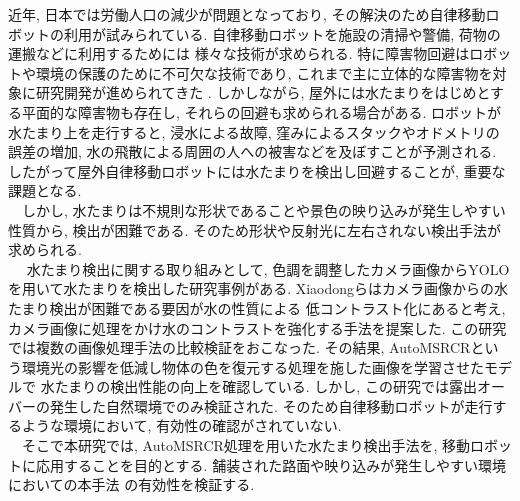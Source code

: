 \documentclass[10pt]{jarticle}
\begin{document}
    近年, 日本では労働人口の減少が問題となっており, 
    その解決のため自律移動ロボットの利用が試みられている. 
    自律移動ロボットを施設の清掃や警備, 荷物の運搬などに利用するためには
    様々な技術が求められる. 
    特に障害物回避はロボットや環境の保護のために不可欠な技術であり, 
    これまで主に立体的な障害物を対象に研究開発が進められてきた\cite{朝田2019} . 
    しかしながら, 屋外には水たまりをはじめとする平面的な障害物も存在し, 
    それらの回避も求められる場合がある. ロボットが水たまり上を走行すると, 
    浸水による故障, 窪みによるスタックやオドメトリの誤差の増加, 
    水の飛散による周囲の人への被害などを及ぼすことが予測される. 
    したがって屋外自律移動ロボットには水たまりを検出し回避することが, 
    重要な課題となる.\\ 
    　しかし, 水たまりは不規則な形状であることや景色の映り込みが発生しやすい性質から, 
    検出が困難である. そのため形状や反射光に左右されない検出手法が求められる.\\
    　 水たまり検出に関する取り組みとして, 
    色調を調整したカメラ画像からYOLOを用いて水たまりを検出した研究事例がある. 
    Xiaodongら\cite{Xiaodong2022}はカメラ画像からの水たまり検出が困難である要因が水の性質による
    低コントラスト化にあると考え, カメラ画像に処理をかけ水のコントラストを強化する手法を提案した. 
    この研究では複数の画像処理手法の比較検証をおこなった. 
    その結果, AutoMSRCRという環境光の影響を低減し物体の色を復元する処理を施した画像を学習させたモデルで
    水たまりの検出性能の向上を確認している. 
    しかし, この研究では露出オーバーの発生した自然環境でのみ検証された.  
    そのため自律移動ロボットが走行するような環境において, 有効性の確認がされていない.   \\
    　そこで本研究では, AutoMSRCR処理を用いた水たまり検出手法を, 移動ロボットに応用することを目的とする. 
    舗装された路面や映り込みが発生しやすい環境においての本手法
    の有効性を検証する.
\end{document}
